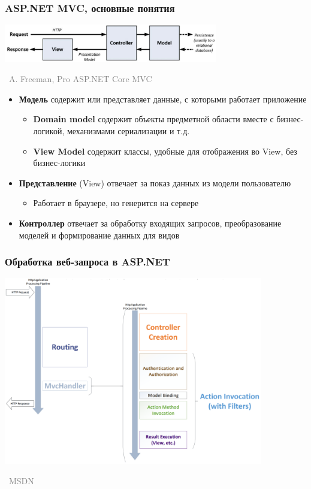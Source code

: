 \documentclass[xetex,mathserif,serif]{beamer}
\newcommand{\attribution}[1] {
\vspace{-5mm}\begin{flushright}\begin{scriptsize}\textcolor{gray}{\textcopyright\, #1}\end{scriptsize}\end{flushright}
}
\begin{document}
	\begin{frame}
		\frametitle{ASP.NET MVC, основные понятия}
		\begin{center}
			\includegraphics[width=0.7\textwidth]{mvc.png}
			\attribution{A. Freeman, Pro ASP.NET Core MVC}
		\end{center}

		\vspace{-5mm}

		\begin{itemize}
			\item \textbf{Модель} содержит или представляет данные, с которыми работает приложение
			\begin{itemize}
				\item \textbf{Domain model} содержит объекты предметной области вместе с бизнес-логикой, механизмами сериализации и т.д.
				\item \textbf{View Model} содержит классы, удобные для отображения во View, без бизнес-логики
			\end{itemize}
			\item \textbf{Представление} (View) отвечает за показ данных из модели пользователю
			\begin{itemize}
				\item Работает в браузере, но генерится на сервере
			\end{itemize}
			\item \textbf{Контроллер} отвечает за обработку входящих запросов, преобразование моделей и формирование данных для видов
		\end{itemize}
	\end{frame}

	\begin{frame}
		\frametitle{Обработка веб-запроса в ASP.NET}
		\begin{center}
			\includegraphics[width=0.85\textwidth]{requestLifecycle.png}
			\vspace{-5mm}
			\attribution{MSDN}
		\end{center}
	\end{frame}
\end{document}
